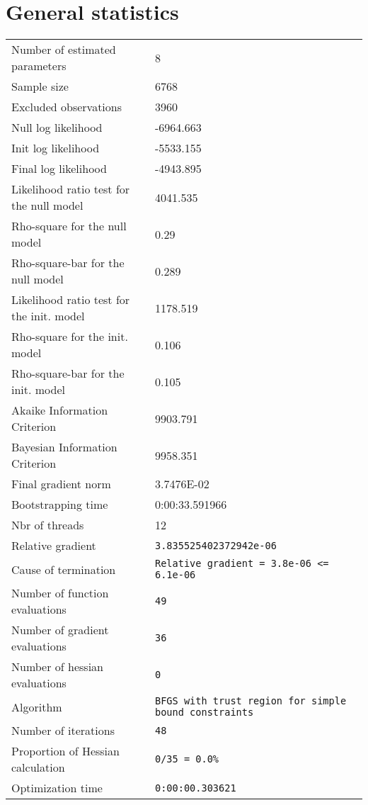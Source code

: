 \section{General statistics}
\begin{tabular}{ll}
Number of estimated parameters & 8 \\
Sample size & 6768 \\
Excluded observations & 3960 \\
Null log likelihood & -6964.663 \\
Init log likelihood & -5533.155 \\
Final log likelihood & -4943.895 \\
Likelihood ratio test for the null model & 4041.535 \\
Rho-square for the null model & 0.29 \\
Rho-square-bar for the null model & 0.289 \\
Likelihood ratio test for the init. model & 1178.519 \\
Rho-square for the init. model & 0.106 \\
Rho-square-bar for the init. model & 0.105 \\
Akaike Information Criterion & 9903.791 \\
Bayesian Information Criterion & 9958.351 \\
Final gradient norm & 3.7476E-02 \\
Bootstrapping time & 0:00:33.591966 \\
Nbr of threads & 12 \\
Relative gradient & \verb$3.835525402372942e-06$ \\
Cause of termination & \verb$Relative gradient = 3.8e-06 <= 6.1e-06$ \\
Number of function evaluations & \verb$49$ \\
Number of gradient evaluations & \verb$36$ \\
Number of hessian evaluations & \verb$0$ \\
Algorithm & \verb$BFGS with trust region for simple bound constraints$ \\
Number of iterations & \verb$48$ \\
Proportion of Hessian calculation & \verb$0/35 = 0.0%$ \\
Optimization time & \verb$0:00:00.303621$ \\
\end{tabular}

